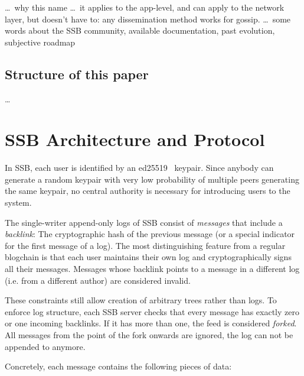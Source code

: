 \documentclass[sigconf]{acmart}
\begin{document}
\ldots\ why this name
\ldots\ it applies to the app-level, and can apply to the network layer, but doesn't have to: any dissemination method works for gossip.
\ldots\ some words about the SSB community, available documentation, past evolution, subjective roadmap \cite{ssb-consortium, tarr:ssb-notes,ssb-on-web,ssb-protocol-guide-2018,staltz-roadmap-2019}

\subsection*{Structure of this paper}

\ldots


\section{SSB Architecture and Protocol}

In SSB, each user is identified by an ed25519~\cite{bernstein2012high} keypair. Since anybody can generate a random keypair with very low probability of multiple peers generating the same keypair, no central authority is necessary for introducing users to the system.

The single-writer append-only logs of SSB consist of {\em messages} that include a {\em backlink}: The cryptographic hash of the previous message (or a special indicator for the first message of a log). The most distinguishing feature from a regular blogchain is that each user maintains their own log and cryptographically signs all their messages. Messages whose backlink points to a message in a different log (i.e. from a different author) are considered invalid.

These constraints still allow creation of arbitrary trees rather than logs. To enforce log structure, each SSB server checks that every message has exactly zero or one incoming backlinks. If it has more than one, the feed is considered {\em forked}. All messages from the point of the fork onwards are ignored, the log can not be appended to anymore.

Concretely, each message contains the following pieces of data:
\end{document}
